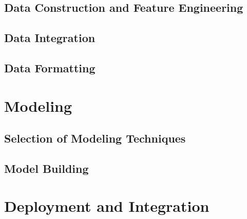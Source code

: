 \subsection{Data Construction and Feature Engineering}

\subsection{Data Integration}

\subsection{Data Formatting}

\section{Modeling}

\subsection{Selection of Modeling Techniques}

\subsection{Model Building}

\section{Deployment and Integration}

